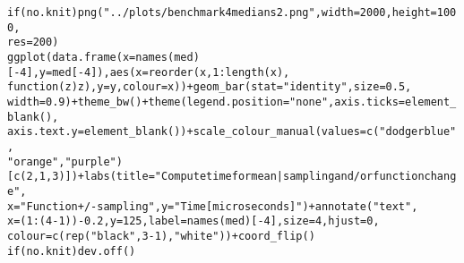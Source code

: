 \documentclass{article}\usepackage[]{graphicx}\usepackage[]{color}
\makeatletter
\newcommand{\hlnum}[1]{\textcolor[rgb]{0.863,0.196,0.184}{#1}}%
\newcommand{\hlstr}[1]{\textcolor[rgb]{0.863,0.196,0.184}{#1}}%
\newcommand{\hlopt}[1]{\textcolor[rgb]{0.576,0.631,0.631}{#1}}%
\newcommand{\hlstd}[1]{\textcolor[rgb]{0.514,0.58,0.588}{#1}}%
\newcommand{\hlkwa}[1]{\textcolor[rgb]{0.796,0.294,0.086}{#1}}%
\newcommand{\hlkwc}[1]{\textcolor[rgb]{0.796,0.294,0.086}{#1}}%
\newcommand{\hlkwd}[1]{\textcolor[rgb]{0.576,0.631,0.631}{#1}}%
\newenvironment{kframe}{%
 \def\at@end@of@kframe{}%
 \ifinner\ifhmode%
  \def\at@end@of@kframe{\end{minipage}}%
  \begin{minipage}{\columnwidth}%
 \fi\fi%
 \def\FrameCommand##1{\hskip\@totalleftmargin \hskip-\fboxsep
 \colorbox{shadecolor}{##1}\hskip-\fboxsep
     \hskip-\linewidth \hskip-\@totalleftmargin \hskip\columnwidth}%
 \MakeFramed {\advance\hsize-\width
   \@totalleftmargin\z@ \linewidth\hsize
   \@setminipage}}%
 {\par\unskip\endMakeFramed%
 \at@end@of@kframe}
\newenvironment{knitrout}{}{} %
\makeatother
\begin{document}
\begin{knitrout}
\color{fgcolor}\begin{kframe}
\begin{alltt}
\hlkwa{if} \hlstd{(no.knit)} \hlkwd{png}\hlstd{(}\hlstr{"../plots/benchmark4medians2.png"}\hlstd{,} \hlkwc{width} \hlstd{=} \hlnum{2000}\hlstd{,} \hlkwc{height} \hlstd{=} \hlnum{1000}\hlstd{,}
    \hlkwc{res} \hlstd{=} \hlnum{200}\hlstd{)}
\hlkwd{ggplot}\hlstd{(}\hlkwd{data.frame}\hlstd{(}\hlkwc{x} \hlstd{=} \hlkwd{names}\hlstd{(med)[}\hlopt{-}\hlnum{4}\hlstd{],} \hlkwc{y} \hlstd{= med[}\hlopt{-}\hlnum{4}\hlstd{]),} \hlkwd{aes}\hlstd{(}\hlkwc{x} \hlstd{=} \hlkwd{reorder}\hlstd{(x,} \hlnum{1}\hlopt{:}\hlkwd{length}\hlstd{(x),}
    \hlkwa{function}\hlstd{(}\hlkwc{z}\hlstd{) z),} \hlkwc{y} \hlstd{= y,} \hlkwc{colour} \hlstd{= x))} \hlopt{+} \hlkwd{geom_bar}\hlstd{(}\hlkwc{stat} \hlstd{=} \hlstr{"identity"}\hlstd{,} \hlkwc{size} \hlstd{=} \hlnum{0.5}\hlstd{,}
    \hlkwc{width} \hlstd{=} \hlnum{0.9}\hlstd{)} \hlopt{+} \hlkwd{theme_bw}\hlstd{()} \hlopt{+} \hlkwd{theme}\hlstd{(}\hlkwc{legend.position} \hlstd{=} \hlstr{"none"}\hlstd{,} \hlkwc{axis.ticks} \hlstd{=} \hlkwd{element_blank}\hlstd{(),}
    \hlkwc{axis.text.y} \hlstd{=} \hlkwd{element_blank}\hlstd{())} \hlopt{+} \hlkwd{scale_colour_manual}\hlstd{(}\hlkwc{values} \hlstd{=} \hlkwd{c}\hlstd{(}\hlstr{"dodgerblue"}\hlstd{,}
    \hlstr{"orange"}\hlstd{,} \hlstr{"purple"}\hlstd{)[}\hlkwd{c}\hlstd{(}\hlnum{2}\hlstd{,} \hlnum{1}\hlstd{,} \hlnum{3}\hlstd{)])} \hlopt{+} \hlkwd{labs}\hlstd{(}\hlkwc{title} \hlstd{=} \hlstr{"Compute time for mean | sampling and/or function change"}\hlstd{,}
    \hlkwc{x} \hlstd{=} \hlstr{"Function +/- sampling"}\hlstd{,} \hlkwc{y} \hlstd{=} \hlstr{"Time [microseconds]"}\hlstd{)} \hlopt{+} \hlkwd{annotate}\hlstd{(}\hlstr{"text"}\hlstd{,}
    \hlkwc{x} \hlstd{= (}\hlnum{1}\hlopt{:}\hlstd{(}\hlnum{4} \hlopt{-} \hlnum{1}\hlstd{))} \hlopt{-} \hlnum{0.2}\hlstd{,} \hlkwc{y} \hlstd{=} \hlnum{125}\hlstd{,} \hlkwc{label} \hlstd{=} \hlkwd{names}\hlstd{(med)[}\hlopt{-}\hlnum{4}\hlstd{],} \hlkwc{size} \hlstd{=} \hlnum{4}\hlstd{,} \hlkwc{hjust} \hlstd{=} \hlnum{0}\hlstd{,}
    \hlkwc{colour} \hlstd{=} \hlkwd{c}\hlstd{(}\hlkwd{rep}\hlstd{(}\hlstr{"black"}\hlstd{,} \hlnum{3} \hlopt{-} \hlnum{1}\hlstd{),} \hlstr{"white"}\hlstd{))} \hlopt{+} \hlkwd{coord_flip}\hlstd{()}
\hlkwa{if} \hlstd{(no.knit)} \hlkwd{dev.off}\hlstd{()}
\end{alltt}
\end{kframe}
\end{knitrout}
\end{document}
